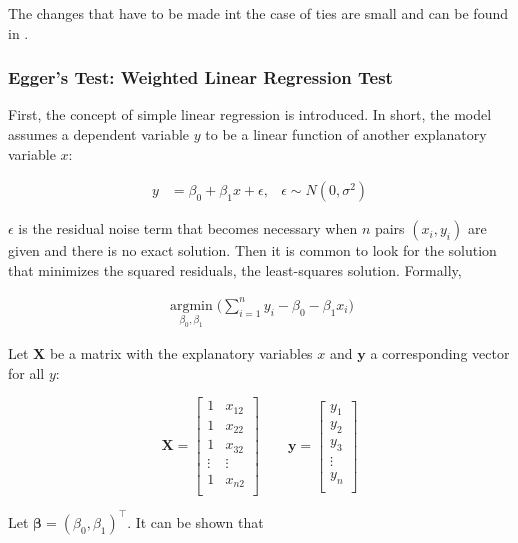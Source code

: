\documentclass[11pt,a4paper,twoside]{book}\usepackage[]{graphicx}\usepackage[]{color}
\begin{document}
The changes that have to be made int the case of ties are small and can be found in \cite[410]{begg.ties}.


\subsubsection{Egger's Test: Weighted Linear Regression Test} \label{sec:Egger}
First, the concept of simple linear regression is introduced. In short, the model assumes a dependent variable $y$ to be a linear function of another explanatory variable $x$:

\begin{align}
y &= \beta_0 + \beta_1 x + \epsilon, & \epsilon \sim N(0, \sigma^2) \label{eq:simple.regression}
\end{align}

$\epsilon$ is the residual noise term that becomes necessary when $n$ pairs $(x_i, y_i)$ are given and there is no exact solution. Then it is common to look for the solution that minimizes the squared residuals, the least-squares solution. Formally,

\begin{align}
\operatorname*{argmin}_{\beta_0, \beta_1}\big(\sum_{i = 1}^n y_i - \beta_0 - \beta_1 x_i\big) \label{eq:least.squares}
\end{align}

Let $\mathbf{X}$ be a matrix with the explanatory variables $x$ and $\mathbf{y}$ a corresponding vector for all $y$:

\begin{equation*}
\mathbf{X} = 
\begin{bmatrix}
1 & x_{12} \\
1 & x_{22} \\
1 & x_{32} \\
\vdots & \vdots \\
1 & x_{n2} \\
\end{bmatrix} 
\qquad
\mathbf{y} = 
\begin{bmatrix}
y_1 \\
y_2 \\
y_3 \\
\vdots \\
y_n \\
\end{bmatrix}
\end{equation*}

Let $\mathbf{\beta} = (\beta_0, \beta_1)^\top$. It can be shown that 
\end{document}
